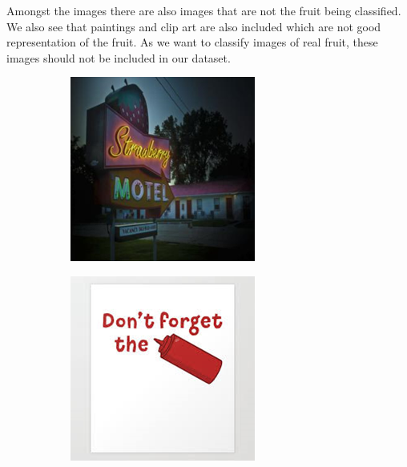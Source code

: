 \documentclass[../main.tex]{subfiles}
\begin{document}
Amongst the images there are also images that are not the fruit being classified. We also see that paintings and clip art are also included which are not good representation of the fruit. As we want to classify images of real fruit, these images should not be included in our dataset. 

\begin{figure}[h!]
  \centering
  \begin{subfigure}[b]{0.2\linewidth}
    \includegraphics[width=\linewidth]{02-invalid-fruits/motel.png}
  \end{subfigure}
  \begin{subfigure}[b]{0.2\linewidth}
    \includegraphics[width=\linewidth]{02-invalid-fruits/ketchup.png}

\end{subfigure}
\end{figure}
\end{document}
